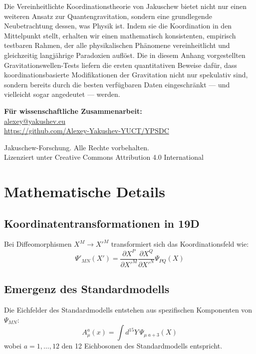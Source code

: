 \documentclass[12pt,a4paper]{article}
\theoremstyle{remark}
\begin{document}
	Die Vereinheitlichte Koordinationstheorie von Jakuschew bietet nicht nur einen weiteren Ansatz zur Quantengravitation, sondern eine grundlegende Neubetrachtung dessen, was Physik ist. Indem sie die Koordination in den Mittelpunkt stellt, erhalten wir einen mathematisch konsistenten, empirisch testbaren Rahmen, der alle physikalischen Phänomene vereinheitlicht und gleichzeitig langjährige Paradoxien auflöst. Die in diesem Anhang vorgestellten Gravitationswellen-Tests liefern die ersten quantitativen Beweise dafür, dass koordinationsbasierte Modifikationen der Gravitation nicht nur spekulativ sind, sondern bereits durch die besten verfügbaren Daten eingeschränkt — und vielleicht sogar angedeutet — werden.
	
	\begin{center}
		\vspace{1cm}
		\textbf{Für wissenschaftliche Zusammenarbeit:}\\
		\url{alexey@yakushev.eu}\\
		\url{https://github.com/Alexey-Yakushev-YUCT/YPSDC}
		
		\vspace{0.5cm}
		 Jakuschew-Forschung. Alle Rechte vorbehalten.\\
		Lizenziert unter Creative Commons Attribution 4.0 International
	\end{center}
	
	\appendix
	\section{Mathematische Details}
	\label{app:math-details}
	
	\subsection{Koordinatentransformationen in 19D}
	
	Bei Diffeomorphismen $X^M \to X'^M$ transformiert sich das Koordinationsfeld wie:
	\[
	\Psi'_{MN}(X') = \frac{\partial X^P}{\partial X'^M} \frac{\partial X^Q}{\partial X'^N} \Psi_{PQ}(X)
	\]
	
	\subsection{Emergenz des Standardmodells}
	
	Die Eichfelder des Standardmodells entstehen aus spezifischen Komponenten von $\Psi_{MN}$:
	\[
	A_\mu^a(x) = \int d^{15}Y \, \Psi_{\mu\;a+3}(X)
	\]
	wobei $a=1,\dots,12$ den 12 Eichbosonen des Standardmodells entspricht.
	
\end{document}
